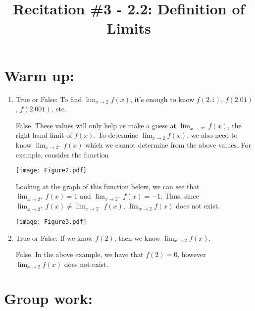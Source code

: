 \documentclass[handout,nooutcomes]{ximera}
\title{Recitation \#3 - 2.2:  Definition of Limits}
\begin{document}
\begin{abstract}		\end{abstract}
\maketitle

\section*{Warm up:} 

	\begin{enumerate}[label=(\alph*)]
	
	\item  True or False: To find $\lim_{x \to 2} f(x)$, it's enough to know $f(2.1)$, $f(2.01)$, $f(2.001)$, etc.
	\begin{freeResponse}
	 False.  These values will only help us make a guess at $\lim_{x \to 2^+} f(x)$, the right hand limit of $f(x)$.  To determine $\lim_{x \to 2} f(x)$, we also need to know $\lim_{x \to 2^-} f(x)$ which we cannot determine from the above values.  For example, consider the function
	 	\begin{image}
	 	\texttt{[image: Figure2.pdf]}
	 	\end{image}
	 	
	Looking at the graph of this function below, we can see that $\lim_{x \to 2^+} f(x) = 1$ and $\lim_{x \to 2^-} f(x) = -1$.  Thus, since $\lim_{x \to 2^+} f(x) \neq \lim_{x \to 2^-} f(x)$, $\lim_{x \to 2} f(x)$ does not exist.
	
		\begin{image}
		\texttt{[image: Figure3.pdf]}
		\end{image}
	\end{freeResponse}
	
	
	
	\item  True or False: If we know $f(2)$, then we know $\lim_{x \to 2} f(x)$.
		\begin{freeResponse}
		False.  In the above example, we have that $f(2) = 0$, however $\lim_{x \to 2} f(x)$ does not exist.
		\end{freeResponse}
	\end{enumerate}



\section*{Group work:}
\end{document}

